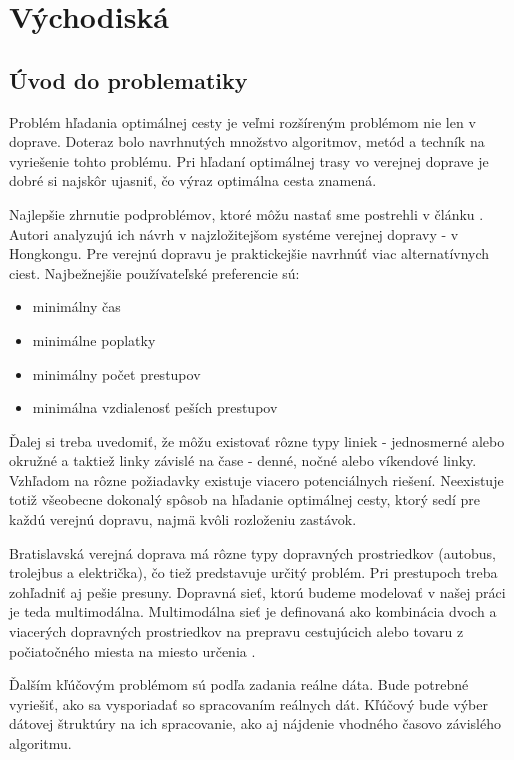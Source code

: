 \chapter{Východiská}
\label{kap:vyc} %

\section{Úvod do problematiky}

Problém hľadania optimálnej cesty je veľmi rozšíreným problémom nie len v doprave. Doteraz bolo navrhnutých množstvo algoritmov, metód a techník na vyriešenie tohto problému. Pri hľadaní optimálnej trasy vo verejnej doprave je dobré si najskôr ujasniť, čo  výraz optimálna cesta znamená.

Najlepšie zhrnutie podproblémov, ktoré môžu nastať sme postrehli v článku \cite{circular}. 
Autori analyzujú ich návrh v najzložitejšom systéme verejnej dopravy - v Hongkongu. Pre verejnú dopravu je praktickejšie navrhnúť viac alternatívnych ciest. Najbežnejšie používateľské preferencie sú:
\begin{itemize}
\item{minimálny čas}
\item{minimálne poplatky}
\item{minimálny počet prestupov}
\item{minimálna vzdialenosť peších prestupov}
\end{itemize}
Ďalej si treba uvedomiť, že môžu existovať rôzne typy liniek - jednosmerné alebo okružné a taktiež linky závislé na čase - denné, nočné alebo víkendové linky. Vzhľadom na rôzne požiadavky existuje viacero potenciálnych riešení. Neexistuje totiž všeobecne dokonalý spôsob na hľadanie optimálnej cesty, ktorý sedí pre každú verejnú dopravu, najmä kvôli rozloženiu zastávok.

Bratislavská verejná doprava má rôzne typy dopravných prostriedkov (autobus, trolejbus a električka), čo tiež predstavuje určitý problém. Pri prestupoch treba zohľadniť aj pešie presuny. Dopravná sieť, ktorú budeme modelovať v našej práci je teda multimodálna. Multimodálna sieť je definovaná ako kombinácia dvoch a viacerých dopravných prostriedkov na prepravu cestujúcich alebo tovaru z počiatočného miesta na miesto určenia \cite{timedependent}.

Ďalším kľúčovým problémom sú podľa zadania reálne dáta. Bude potrebné vyriešiť, ako sa vysporiadať so spracovaním reálnych dát. Kľúčový bude výber dátovej štruktúry na ich spracovanie, ako aj nájdenie vhodného časovo závislého algoritmu.

